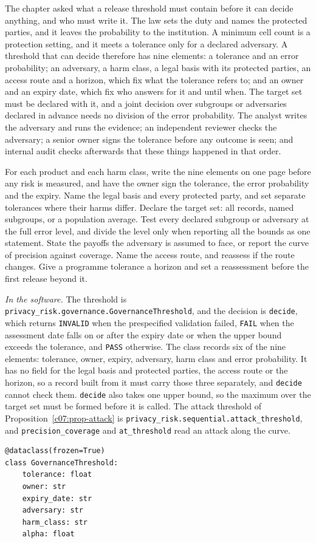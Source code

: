 The chapter asked what a release threshold must contain before it can decide
anything, and who must write it. The law sets the duty and names the protected
parties, and it leaves the probability to the institution. A minimum cell count is
a protection setting, and it meets a tolerance only for a declared adversary. A
threshold that can decide therefore has nine elements: a tolerance and an error
probability; an adversary, a harm class, a legal basis with its protected parties,
an access route and a horizon, which fix what the tolerance refers to; and an owner
and an expiry date, which fix who answers for it and until when. The target set
must be declared with it, and a joint decision over subgroups or adversaries
declared in advance needs no division of the error probability. The analyst writes
the adversary and runs the evidence; an independent reviewer checks the adversary;
a senior owner signs the tolerance before any outcome is seen; and internal audit
checks afterwards that these things happened in that order.

\begin{inpractice}\sloppy
For each product and each harm class, write the nine elements on one page before
any risk is measured, and have the owner sign the tolerance, the error probability
and the expiry. Name the legal basis and every protected party, and set separate
tolerances where their harms differ. Declare the target set: all records, named
subgroups, or a population average. Test every declared subgroup or adversary at
the full error level, and divide the level only when reporting all the bounds as
one statement. State the payoffs the adversary is assumed to face, or report the
curve of precision against coverage. Name the access route, and reassess if the
route changes. Give a programme tolerance a horizon and set a reassessment before
the first release beyond it.

\smallskip\noindent\textit{In the software.} The threshold is
\texttt{privacy\_risk.governance.GovernanceThreshold}, and the decision is
\texttt{decide}, which returns \texttt{INVALID} when the prespecified validation
failed, \texttt{FAIL} when the assessment date falls on or after the expiry date or
when the upper bound exceeds the tolerance, and \texttt{PASS} otherwise. The class
records six of the nine elements: tolerance, owner, expiry, adversary, harm class
and error probability. It has no field for the legal basis and protected parties,
the access route or the horizon, so a record built from it must carry those three
separately, and \texttt{decide} cannot check them. \texttt{decide} also takes one
upper bound, so the maximum over the target set must be formed before it is
called. The attack threshold of Proposition~\ref{c07:prop-attack} is
\texttt{privacy\_risk.sequential.attack\_threshold}, and
\texttt{precision\_coverage} and \texttt{at\_threshold} read an attack along the
curve.
\begin{lstlisting}
@dataclass(frozen=True)
class GovernanceThreshold:
    tolerance: float
    owner: str
    expiry_date: str
    adversary: str
    harm_class: str
    alpha: float
\end{lstlisting}
\end{inpractice}

